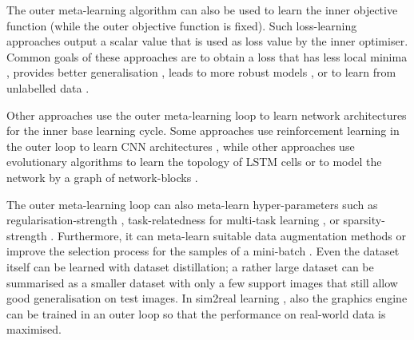 The outer meta-learning algorithm can also be used to learn the inner objective function (while the outer objective function is fixed).
Such loss-learning approaches output a scalar value that is used as loss value by the inner optimiser.
Common goals of these approaches are to obtain a loss that has less local minima \cite{NEURIPS2018_7876acb6, Sung_Zhang_Xiang_Hospedales_Yang_2017}, provides better generalisation \cite{NEURIPS2018_b9a25e42, NEURIPS2019_e0e2b58d, gonzalez2020improved}, leads to more robust models \cite{li2019feature}, or to learn from unlabelled data \cite{NEURIPS2019_6018df18, Boney2018SemiSupervisedFL}.

Other approaches use the outer meta-learning loop to learn network architectures for the inner base learning cycle.
Some approaches use reinforcement learning in the outer loop to learn CNN architectures , while other approaches use evolutionary algorithms to learn the topology of LSTM cells  or to model the network by a graph of network-blocks .

The outer meta-learning loop can also meta-learn hyper-parameters such as regularisation-strength \cite{pmlr-v80-franceschi18a, Micaelli_Storkey_2021}, task-relatedness for multi-task learning , or sparsity-strength \cite{10-5555-3305381-3305502}. Furthermore, it can meta-learn suitable data augmentation methods \cite{Cubuk_2019_CVPR, Li_Hu_Wang_Hospedales_Robertson_Yang_2020} or improve the selection process for the samples of a mini-batch \cite{10-1609-aaai-v33i01-33015741, fan2018learning}.
Even the dataset itself can be learned with dataset distillation; a rather large dataset can be summarised as a smaller dataset with only a few support images \cite{Wang_Zhu_Torralba_Efros_2020, pmlr-v108-lorraine20a} that still allow good generalisation on test images. In sim2real learning , also the graphics engine \cite{ruiz2018learning, Vuong_Vikram_Su_Gao_Christensen_2019} can be trained in an outer loop so that the performance on real-world data is maximised.


